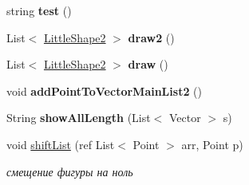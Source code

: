 \begin{DoxyCompactItemize}
\item 
\hypertarget{classtwelve_1_1_filler8_a80cf93d1ea5bd7268dcc62561b7e5c61}{}string {\bfseries test} ()\label{classtwelve_1_1_filler8_a80cf93d1ea5bd7268dcc62561b7e5c61}

\item 
\hypertarget{classtwelve_1_1_filler8_a502b983ecb3346627fd19a9bece62007}{}List$<$ \hyperlink{classtwelve_1_1_little_shape2}{Little\+Shape2} $>$ {\bfseries draw2} ()\label{classtwelve_1_1_filler8_a502b983ecb3346627fd19a9bece62007}

\item 
\hypertarget{classtwelve_1_1_filler8_ae0ed8a603fd08b882e7d12554c1e425a}{}List$<$ \hyperlink{classtwelve_1_1_little_shape2}{Little\+Shape2} $>$ {\bfseries draw} ()\label{classtwelve_1_1_filler8_ae0ed8a603fd08b882e7d12554c1e425a}

\item 
\hypertarget{classtwelve_1_1_filler8_a5ab74064ac449309f1a5cbfb3fa3a7ea}{}void {\bfseries add\+Point\+To\+Vector\+Main\+List2} ()\label{classtwelve_1_1_filler8_a5ab74064ac449309f1a5cbfb3fa3a7ea}

\item 
\hypertarget{classtwelve_1_1_filler8_a84b9242cae9facc888d18309fa81806c}{}String {\bfseries show\+All\+Length} (List$<$ Vector $>$ s)\label{classtwelve_1_1_filler8_a84b9242cae9facc888d18309fa81806c}

\item 
void \hyperlink{classtwelve_1_1_filler8_ad544e52a339c70654352078c72734303}{shift\+List} (ref List$<$ Point $>$ arr, Point p)
\begin{DoxyCompactList}\small\item\em смещение фигуры на ноль \end{DoxyCompactList}\end{DoxyCompactItemize}
